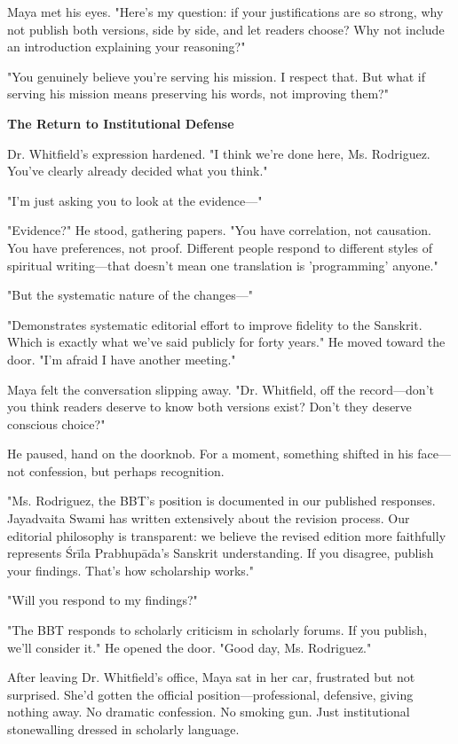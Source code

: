 \documentclass[12pt]{article}
\begin{document}
Maya met his eyes. "Here's my question: if your justifications are so strong, why not publish both versions, side by side, and let readers choose? Why not include an introduction explaining your reasoning?"

"You genuinely believe you're serving his mission. I respect that. But what if serving his mission means preserving his words, not improving them?"

\textbf{The Return to Institutional Defense}

Dr. Whitfield's expression hardened. "I think we're done here, Ms. Rodriguez. You've clearly already decided what you think."

"I'm just asking you to look at the evidence—"

"Evidence?" He stood, gathering papers. "You have correlation, not causation. You have preferences, not proof. Different people respond to different styles of spiritual writing—that doesn't mean one translation is 'programming' anyone."

"But the systematic nature of the changes—"

"Demonstrates systematic editorial effort to improve fidelity to the Sanskrit. Which is exactly what we've said publicly for forty years." He moved toward the door. "I'm afraid I have another meeting."

Maya felt the conversation slipping away. "Dr. Whitfield, off the record—don't you think readers deserve to know both versions exist? Don't they deserve conscious choice?"

He paused, hand on the doorknob. For a moment, something shifted in his face—not confession, but perhaps recognition.

"Ms. Rodriguez, the BBT's position is documented in our published responses. Jayadvaita Swami has written extensively about the revision process. Our editorial philosophy is transparent: we believe the revised edition more faithfully represents Śrīla Prabhupāda's Sanskrit understanding. If you disagree, publish your findings. That's how scholarship works."

"Will you respond to my findings?"

"The BBT responds to scholarly criticism in scholarly forums. If you publish, we'll consider it." He opened the door. "Good day, Ms. Rodriguez."

After leaving Dr. Whitfield's office, Maya sat in her car, frustrated but not surprised. She'd gotten the official position—professional, defensive, giving nothing away. No dramatic confession. No smoking gun. Just institutional stonewalling dressed in scholarly language.
\end{document}
